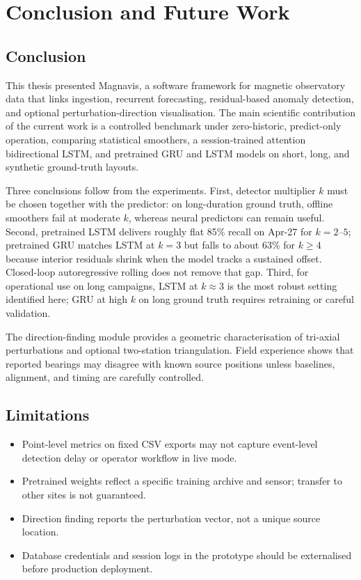 \chapter{Conclusion and Future Work}
\label{Chapter7}

\section{Conclusion}
This thesis presented Magnavis, a software framework for magnetic observatory data that links ingestion, recurrent forecasting, residual-based anomaly detection, and optional perturbation-direction visualisation. The main scientific contribution of the current work is a controlled benchmark under zero-historic, predict-only operation, comparing statistical smoothers, a session-trained attention bidirectional LSTM, and pretrained GRU and LSTM models on short, long, and synthetic ground-truth layouts.

Three conclusions follow from the experiments. First, detector multiplier $k$ must be chosen together with the predictor: on long-duration ground truth, offline smoothers fail at moderate $k$, whereas neural predictors can remain useful. Second, pretrained LSTM delivers roughly flat 85\% recall on Apr-27 for $k=2$--$5$; pretrained GRU matches LSTM at $k=3$ but falls to about 63\% for $k \ge 4$ because interior residuals shrink when the model tracks a sustained offset. Closed-loop autoregressive rolling does not remove that gap. Third, for operational use on long campaigns, LSTM at $k \approx 3$ is the most robust setting identified here; GRU at high $k$ on long ground truth requires retraining or careful validation.

The direction-finding module provides a geometric characterisation of tri-axial perturbations and optional two-station triangulation. Field experience shows that reported bearings may disagree with known source positions unless baselines, alignment, and timing are carefully controlled.

\section{Limitations}
\begin{itemize}
    \item Point-level metrics on fixed CSV exports may not capture event-level detection delay or operator workflow in live mode.
    \item Pretrained weights reflect a specific training archive and sensor; transfer to other sites is not guaranteed.
    \item Direction finding reports the perturbation vector, not a unique source location.
    \item Database credentials and session logs in the prototype should be externalised before production deployment.
\end{itemize}

